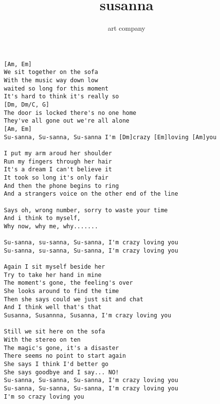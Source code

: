 \author{art company}
\title{susanna}
\maketitle
\begin{verbatim}
[Am, Em]
We sit together on the sofa
With the music way down low
waited so long for this moment
It's hard to think it's really so
[Dm, Dm/C, G]
The door is locked there's no one home
They've all gone out we're all alone
[Am, Em]
Su-sanna, Su-sanna, Su-sanna I'm [Dm]crazy [Em]loving [Am]you

I put my arm aroud her shoulder
Run my fingers through her hair
It's a dream I can't believe it
It took so long it's only fair
And then the phone begins to ring
And a strangers voice on the other end of the line

Says oh, wrong number, sorry to waste your time
And i think to myself,
Why now, why me, why.......

Su-sanna, su-sanna, Su-sanna, I'm crazy loving you
Su-sanna, su-sanna, Su-sanna, I'm crazy loving you

Again I sit myself beside her
Try to take her hand in mine
The moment's gone, the feeling's over
She looks around to find the time
Then she says could we just sit and chat
And I think well that's that
Susanna, Susannna, Susanna, I'm crazy loving you

Still we sit here on the sofa
With the stereo on ten
The magic's gone, it's a disaster
There seems no point to start again
She says I think I'd better go
She says goodbye and I say... NO!
Su-sanna, Su-sanna, Su-sanna, I'm crazy loving you
Su-sanna, Su-sanna, Su-sanna, I'm crazy loving you
I'm so crazy loving you 
\end{verbatim}